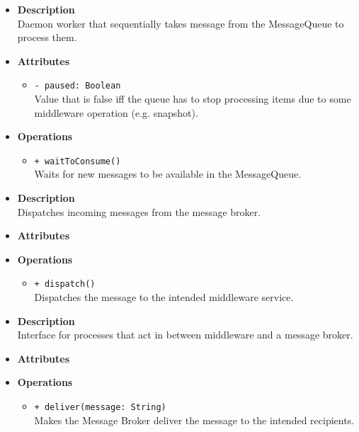 \FloatBarrier
\begin{itemize}
  \item \textbf{Description} \\
    Daemon worker that sequentially takes message from the MessageQueue to
    process them.
  \item \textbf{Attributes}
    \begin{itemize}
      \item \texttt{- paused: Boolean} \\
        Value that is false iff the queue has to stop processing items due to
        some middleware operation (e.g. snapshot).
    \end{itemize}
  \item \textbf{Operations}
  \begin{itemize}
    \item \texttt{+ waitToConsume()} \\
    Waits for new messages to be available in the MessageQueue.
  \end{itemize}
\end{itemize}

\FloatBarrier
\begin{itemize}
  \item \textbf{Description} \\
    Dispatches incoming messages from the message broker.
  \item \textbf{Attributes}
  \item \textbf{Operations}
  \begin{itemize}
    \item \texttt{+ dispatch()} \\
    Dispatches the message to the intended middleware service.
  \end{itemize}
\end{itemize}

\FloatBarrier
\begin{itemize}
  \item \textbf{Description} \\
    Interface for processes that act in between middleware and a message
    broker.
  \item \textbf{Attributes}
  \item \textbf{Operations}
  \begin{itemize}
    \item \texttt{+ deliver(message: String)} \\
    Makes the Message Broker deliver the message to the intended recipients.
  \end{itemize}
\end{itemize}

